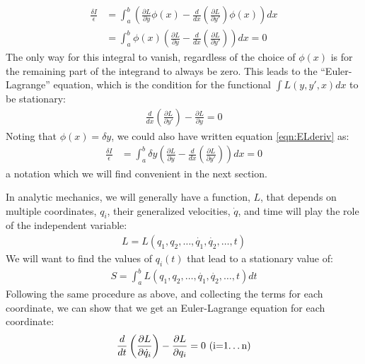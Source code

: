 \begin{align}
\frac{\delta I}{\epsilon} &=\int_a^b  \left( \frac{\partial L}{\partial y}\phi(x)-\frac{d}{dx}\left(\frac{\partial L}{\partial y'}\right)\phi(x)\right)dx\nonumber\\
&=\int_a^b  \phi(x)\left( \frac{\partial L}{\partial y}-\frac{d}{dx}\left(\frac{\partial L}{\partial y'}\right)\right)dx=0
\label{eqn:ELderiv}
\end{align}
The only way for this integral to vanish, regardless of the choice of $\phi(x)$ is for the remaining part of the integrand to always be zero. This leads to the ``Euler-Lagrange'' equation, which is the condition for the functional $\int L(y,y',x)dx$ to be stationary:
\begin{align}
\frac{d}{dx}\left(\frac{\partial L}{\partial y'}\right)-\frac{\partial L}{\partial y}=0
\end{align}
Noting that $\phi(x)=\delta y$, we could also have written equation \ref{eqn:ELderiv} as:
\begin{align}
\frac{\delta I}{\epsilon} &=\int_a^b  \delta y\left( \frac{\partial L}{\partial y}-\frac{d}{dx}\left(\frac{\partial L}{\partial y'}\right)\right)dx=0
\end{align}
a notation which we will find convenient in the next section. 


\noindent
In analytic mechanics, we will generally have a function, $L$, that depends on multiple coordinates, $q_i$, their generalized velocities, $\dot{q}$, and time will play the role of the independent variable:
\begin{align}
L=L(q_1,q_2,\dots,\dot{q_1}, \dot{q_2},\dots,t)
\end{align}
We will want to find the values of $q_i(t)$ that lead to a stationary value of:
\begin{align}
S=\int_a^b L(q_1,q_2,\dots,\dot{q_1}, \dot{q_2},\dots,t)dt
\end{align}
Following the same procedure as above, and collecting the terms for each coordinate, we can show that we get an Euler-Lagrange equation for each coordinate:
\begin{align}
\frac{d}{dt}\left(\frac{\partial L}{\partial \dot{q}_i}\right)-\frac{\partial L}{\partial q_i}=0 \text{              (i=1\dots n)}
\end{align}



